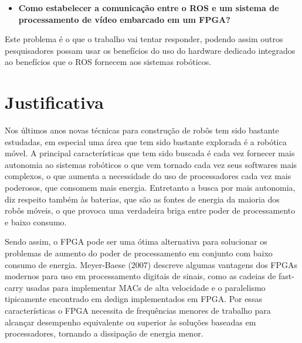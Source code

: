 \begin{itemize}
    \item \textbf{Como estabelecer a comunicação entre o ROS e um sistema de processamento de vídeo 
embarcado em um FPGA?}

\end{itemize}

Este problema é o que o trabalho vai tentar responder, podendo assim outros pesquisadores possam usar 
os benefícios do uso do hardware dedicado integrados ao benefícios que o ROS fornecem aos sistemas 
robóticos.





  







\section{Justificativa}

Nos últimos anos novas técnicas para construção de robôs tem sido bastante estudadas, em 
especial uma área que tem sido bastante explorada é a robótica móvel. A principal 
características que tem sido buscada é cada vez fornecer mais autonomia ao sistemas 
robóticos o que vem tornado cada vez seus softwares mais complexos, o que aumenta a 
necessidade do uso de processadores cada vez mais poderosos, que consomem mais energia. 
Entretanto a busca por mais autonomia, diz respeito também às baterias, que são as fontes 
de energia da maioria dos robôs móveis, o que provoca uma verdadeira briga entre poder 
de processamento e baixo consumo.

Sendo assim, o FPGA pode ser uma ótima alternativa para solucionar os problemas de aumento 
do poder de processamento em conjunto com baixo consumo de energia. Meyer-Baese (2007) 
descreve algumas vantagens dos FPGAs modernos para uso em processamento digitais de 
sinais, como as cadeias de fast-carry usadas para implementar MACs de alta velocidade e o 
paralelismo tipicamente encontrado em dedign implementados em FPGA. Por essas 
características o FPGA necessita de frequências menores de trabalho para alcançar 
desempenho equivalente ou superior às soluções baseadas em processadores, tornando a 
dissipação de energia menor.

